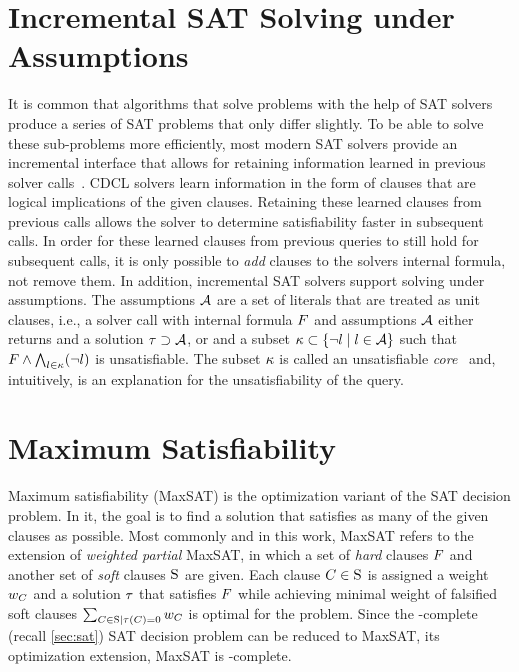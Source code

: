 \section{Incremental SAT Solving under Assumptions\label{sec:inc-sat}}

It is common that algorithms that solve problems with the help of SAT solvers produce a series of SAT problems that only differ slightly.
To be able to solve these sub-problems more efficiently, most modern SAT solvers provide an incremental interface that allows for retaining information learned in previous solver calls~\autocites{DBLP:journals/entcs/EenS03,handbook2-cdcl}.
CDCL solvers learn information in the form of clauses that are logical implications of the given clauses.
Retaining these learned clauses from previous calls allows the solver to determine satisfiability faster in subsequent calls.
In order for these learned clauses from previous queries to still hold for subsequent calls, it is only possible to \emph{add} clauses to the solvers internal formula, not remove them.
In addition, incremental SAT solvers support solving under assumptions.
The assumptions $\mathcal{A}$ are a set of literals that are treated as unit clauses, i.e., a solver call with internal formula $F$ and assumptions $\mathcal{A}$ either returns \sat{} and a solution $\tau \supset \mathcal{A}$, or \unsat{} and a subset $\kappa \subset \{\lnot l \mid l\in\mathcal{A}\}$ such that $F \land \bigwedge_{l \in \kappa} (\lnot l)$ is unsatisfiable.
The subset $\kappa$ is called an unsatisfiable \emph{core}~\autocite{handbook2-cdcl} and, intuitively, is an explanation for the unsatisfiability of the query.

\section{Maximum Satisfiability\label{sec:max-sat}}

Maximum satisfiability (MaxSAT) is the optimization variant of the SAT decision problem.
In it, the goal is to find a solution that satisfies as many of the given clauses as possible.
Most commonly and in this work, MaxSAT refers to the extension of \emph{weighted partial} MaxSAT, in which a set of \emph{hard} clauses $F$ and another set of \emph{soft} clauses $\textsc{S}$ are given.
Each clause $C \in \textsc{S}$ is assigned a weight $w_C$ and a solution $\tau$ that satisfies $F$ while achieving minimal weight of falsified soft clauses $\sum_{C\in\textsc{S} \mid \tau(C)=0} w_C$ is optimal for the problem.
Since the \NP-complete (recall \cref{sec:sat}) SAT decision problem can be reduced to MaxSAT, its optimization extension, MaxSAT is \NP-complete.

